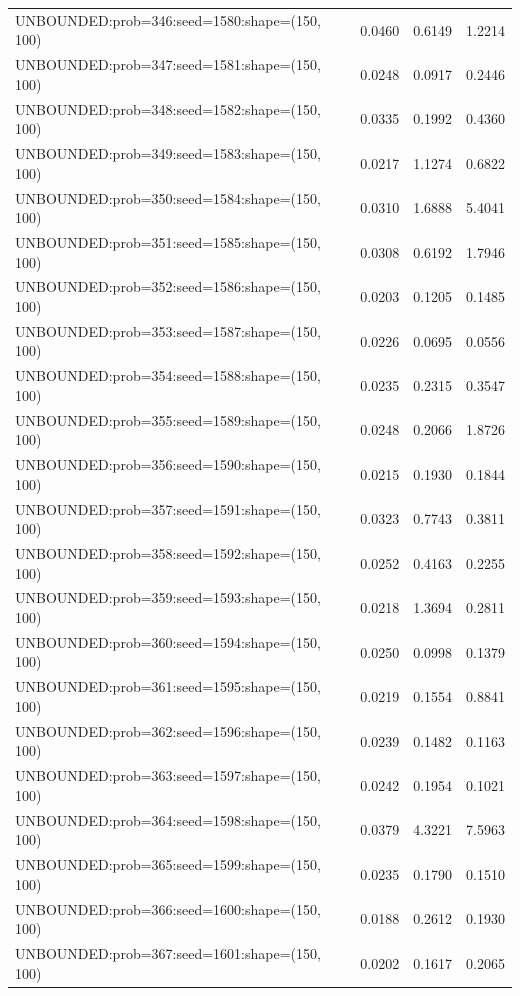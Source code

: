 \begin{longtable}{lccc}
UNBOUNDED:prob=346:seed=1580:shape=(150, 100) &   0.0460 &  0.6149 &  1.2214 \\
UNBOUNDED:prob=347:seed=1581:shape=(150, 100) &   0.0248 &  0.0917 &  0.2446 \\
UNBOUNDED:prob=348:seed=1582:shape=(150, 100) &   0.0335 &  0.1992 &  0.4360 \\
UNBOUNDED:prob=349:seed=1583:shape=(150, 100) &   0.0217 &  1.1274 &  0.6822 \\
UNBOUNDED:prob=350:seed=1584:shape=(150, 100) &   0.0310 &  1.6888 &  5.4041 \\
UNBOUNDED:prob=351:seed=1585:shape=(150, 100) &   0.0308 &  0.6192 &  1.7946 \\
UNBOUNDED:prob=352:seed=1586:shape=(150, 100) &   0.0203 &  0.1205 &  0.1485 \\
UNBOUNDED:prob=353:seed=1587:shape=(150, 100) &   0.0226 &  0.0695 &  0.0556 \\
UNBOUNDED:prob=354:seed=1588:shape=(150, 100) &   0.0235 &  0.2315 &  0.3547 \\
UNBOUNDED:prob=355:seed=1589:shape=(150, 100) &   0.0248 &  0.2066 &  1.8726 \\
UNBOUNDED:prob=356:seed=1590:shape=(150, 100) &   0.0215 &  0.1930 &  0.1844 \\
UNBOUNDED:prob=357:seed=1591:shape=(150, 100) &   0.0323 &  0.7743 &  0.3811 \\
UNBOUNDED:prob=358:seed=1592:shape=(150, 100) &   0.0252 &  0.4163 &  0.2255 \\
UNBOUNDED:prob=359:seed=1593:shape=(150, 100) &   0.0218 &  1.3694 &  0.2811 \\
UNBOUNDED:prob=360:seed=1594:shape=(150, 100) &   0.0250 &  0.0998 &  0.1379 \\
UNBOUNDED:prob=361:seed=1595:shape=(150, 100) &   0.0219 &  0.1554 &  0.8841 \\
UNBOUNDED:prob=362:seed=1596:shape=(150, 100) &   0.0239 &  0.1482 &  0.1163 \\
UNBOUNDED:prob=363:seed=1597:shape=(150, 100) &   0.0242 &  0.1954 &  0.1021 \\
UNBOUNDED:prob=364:seed=1598:shape=(150, 100) &   0.0379 &  4.3221 &  7.5963 \\
UNBOUNDED:prob=365:seed=1599:shape=(150, 100) &   0.0235 &  0.1790 &  0.1510 \\
UNBOUNDED:prob=366:seed=1600:shape=(150, 100) &   0.0188 &  0.2612 &  0.1930 \\
UNBOUNDED:prob=367:seed=1601:shape=(150, 100) &   0.0202 &  0.1617 &  0.2065 \\

\end{longtable}
